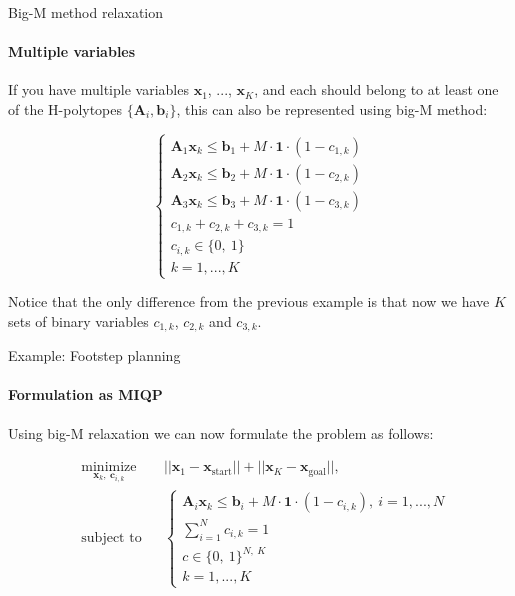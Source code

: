 \documentclass{beamer}
\begin{document}
\begin{frame}{Big-M method relaxation}
\framesubtitle{Multiple variables}
\begin{flushleft}

If you have multiple variables $\mathbf{x}_1$, ..., $\mathbf{x}_K$, and each should belong to at least one of the H-polytopes $\{ \mathbf{A}_i, \mathbf{b}_i\}$, this can also be represented using big-M method:

\begin{equation}
    \begin{cases}
    \mathbf{A}_1 \mathbf{x}_k \leq \mathbf{b}_1 + M \cdot \mathbf{1} \cdot (1 - c_{1, k}) \\
    \mathbf{A}_2 \mathbf{x}_k \leq \mathbf{b}_2 + M \cdot \mathbf{1} \cdot (1 - c_{2, k}) \\
    \mathbf{A}_3 \mathbf{x}_k \leq \mathbf{b}_3 + M \cdot \mathbf{1} \cdot (1 - c_{3, k}) \\
    c_{1, k} + c_{2, k} + c_{3, k} = 1 \\
    c_{i, k}  \in \{0, \ 1 \} \\
    k = 1,...,K
    \end{cases}
\end{equation}

Notice that the only difference from the previous example is that now we have $K$ sets of binary variables $c_{1, k}$,  $c_{2, k}$ and $c_{3, k}$.

\end{flushleft}
\end{frame}






\begin{frame}{Example: Footstep planning}
\framesubtitle{Formulation as MIQP}
\begin{flushleft}

Using big-M relaxation we can now formulate the problem as follows:

\begin{equation}
\begin{aligned}
& \underset{\mathbf{x}_k, \ \mathbf{c}_{i,k}}{\text{minimize}}
& & ||\mathbf{x}_1 - \mathbf{x}_{\text{start}}|| + ||\mathbf{x}_K - \mathbf{x}_{\text{goal}}||, \\
& \text{subject to}
& & \begin{cases}
    \mathbf{A}_i \mathbf{x}_k \leq \mathbf{b}_i + M \cdot \mathbf{1} \cdot (1 - c_{i, k}), \ i = 1,...,N \\
    \sum_{i=1}^N c_{i, k} = 1 \\
    c  \in \{0, \ 1 \}^{N, \ K} \\
    k = 1,...,K
    \end{cases}
\end{aligned}
\end{equation}

 
\end{flushleft}
\end{frame}
\end{document}
